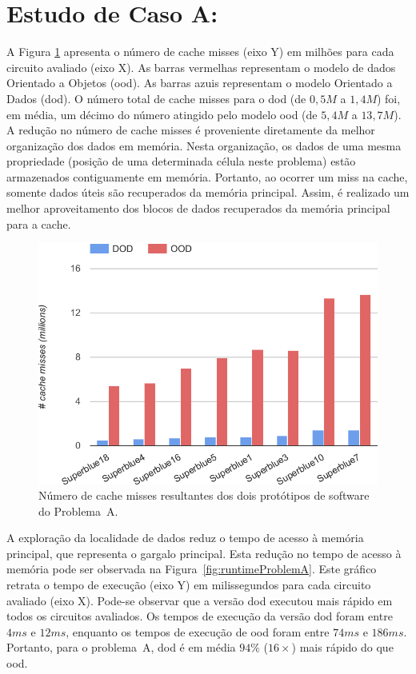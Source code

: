\section{Estudo de Caso A:}
\label{sec:problema_a}

A Figura \ref{fig:missProblemA} apresenta o número de cache misses (eixo Y) em milhões para cada circuito avaliado (eixo X). As barras vermelhas representam o modelo de dados Orientado a Objetos (\ac{ood}). As barras azuis representam o modelo Orientado a Dados (\ac{dod}). O número total de cache misses para o \ac{dod} (de $0,5M$ a $1,4M$) foi, em média, um décimo do número atingido pelo modelo \ac{ood} (de $5,4M$ a $13,7M$). A redução no número de cache misses é proveniente diretamente da melhor organização dos dados em memória. Nesta organização, os dados de uma mesma propriedade (posição de uma determinada célula neste problema) estão armazenados contiguamente em memória. Portanto, ao ocorrer um miss na cache, somente dados úteis são recuperados da memória principal. Assim, é realizado um melhor aproveitamento dos blocos de dados recuperados da memória principal para a cache.

\begin{figure}[ht]
    \centering
    \includegraphics[width=0.65\linewidth]{img/results/missProblemA}
    \caption[Cache misses do Problema~A.]{Número de cache misses resultantes dos dois protótipos de software do Problema~A.}
    \label{fig:missProblemA}
\end{figure}

A exploração da localidade de dados reduz o tempo de acesso à memória principal, que representa o gargalo principal. Esta redução no tempo de acesso à memória pode ser observada na Figura~\ref{fig:runtimeProblemA}. Este gráfico retrata o tempo de execução (eixo Y) em milissegundos para cada circuito avaliado (eixo X). Pode-se observar que a versão \ac{dod} executou mais rápido em todos os circuitos avaliados. Os tempos de execução da versão \ac{dod} foram entre $4ms$ e $12ms$, enquanto os tempos de execução de \ac{ood} foram entre $74ms$ e $186ms$. Portanto, para o problema~A, \ac{dod} é em média $94\%$ ($16\times$) mais rápido do que \ac{ood}.


